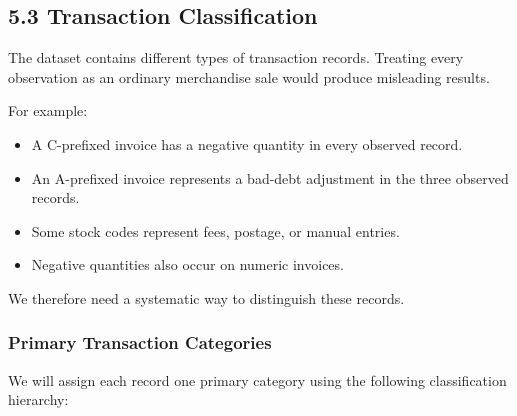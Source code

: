 \documentclass[11pt]{article}
\providecommand{\tightlist}{%
      \setlength{\itemsep}{0pt}\setlength{\parskip}{0pt}}
\begin{document}
    
    \subsection{5.3 Transaction
Classification}\label{transaction-classification}

The dataset contains different types of transaction records. Treating
every observation as an ordinary merchandise sale would produce
misleading results.

For example:

\begin{itemize}
\tightlist
\item
  A C-prefixed invoice has a negative quantity in every observed record.
\item
  An A-prefixed invoice represents a bad-debt adjustment in the three
  observed records.
\item
  Some stock codes represent fees, postage, or manual entries.
\item
  Negative quantities also occur on numeric invoices.
\end{itemize}

We therefore need a systematic way to distinguish these records.

\subsubsection{Primary Transaction
Categories}\label{primary-transaction-categories}

We will assign each record one primary category using the following
classification hierarchy:
\end{document}

